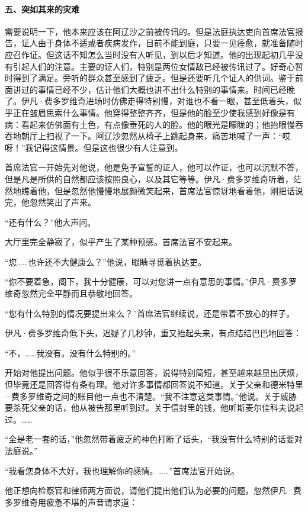 \paragraph*{五、突如其来的灾难}
\par 需要说明一下，他本来应该在阿辽沙之前被传讯的。但是法庭执达吏向首席法官报告，证人由于身体不适或者疾病发作，目前不能到庭，只要一见痊愈，就准备随时应召作证。但这话不知怎么当时没有人听见，到以后才知道。他的出现起初几乎没有引起人们的注意。主要的证人们，特别是两位女情敌已经被传讯过了。好奇心暂时得到了满足。旁听的群众甚至感到了疲乏。但是还要听几个证人的供词。鉴于前面讲过的事情已经不少，估计他们大概也讲不出什么特别的事情来。时间已经晚了。伊凡·费多罗维奇进场时仿佛走得特别慢，对谁也不看一眼，甚至低着头，似乎正在皱眉思索什么事情。他穿得整整齐齐，但是他的脸至少使我感到好像是有病：看起来仿佛面有土色，有点像垂死的人的脸。他的眼光是矇眬的；他抬眼慢吞吞地朝厅上扫视了一下。阿辽沙忽然从椅子上跳起身来，痛苦地喊了一声：“哎呀！”我记得这情景。但是这也很少有人注意到。
\par 首席法官一开始先对他说，他是免予宣誓的证人，他可以作证，也可以沉默不答，但是凡是所供的自然都应该按照良心，以及其它等等。伊凡·费多罗维奇听着，茫然地瞧着他，但是忽然他慢慢地展颜微笑起来，首席法官惊讶地看着他，刚把话说完，他忽然笑出了声来。
\par “还有什么？”他大声问。
\par 大厅里完全静寂了，似乎产生了某种预感。首席法官不安起来。
\par “您……也许还不大健康么？”他说，眼睛寻觅着执达吏。
\par “你不要着急，阁下，我十分健康，可以对您讲一点有意思的事情。”伊凡·费多罗维奇忽然完全平静而且恭敬地回答。
\par “您有什么特别的情况要提出来么？”首席法官继续说，还是带着不放心的样子。
\par 伊凡·费多罗维奇低下头，迟疑了几秒钟，重又抬起头来，有点结结巴巴地回答：
\par “不，……我没有。没有什么特别的。”
\par 开始对他提出问题。他似乎很不乐意回答，说得特别简短，甚至越来越显出厌烦，但毕竟还是回答得有条有理。他对许多事情都回答说不知道。关于父亲和德米特里·费多罗维奇之间的账目他一点也不清楚。“我不注意这类事情。”他说。关于威胁要杀死父亲的话，他从被告那里听到过。关于信封里的钱，他听斯麦尔佳科夫说起过。……
\par “全是老一套的话，”他忽然带着疲乏的神色打断了话头，“我没有什么特别的话要对法庭说。”
\par “我看您身体不大好，我也理解你的感情。……”首席法官开始说。
\par 他正想向检察官和律师两方面说，请他们提出他们认为必要的问题，忽然伊凡·费多罗维奇用疲惫不堪的声音请求道：
